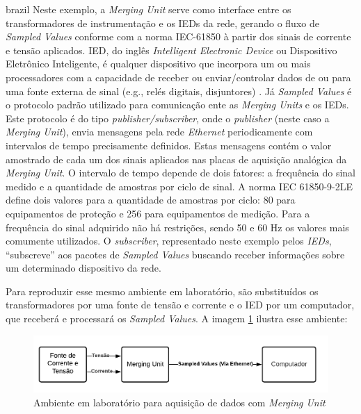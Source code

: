\begin{otherlanguage*}{brazil}
Neste exemplo, a \textit{Merging Unit} serve como interface entre os transformadores de instrumentação e os IEDs da rede, gerando o fluxo de \textit{Sampled Values} conforme com a norma IEC-61850 \cite{IEC61850_7-2} à partir dos sinais de corrente e tensão aplicados. IED, do inglês \textit{Intelligent Electronic Device} ou Dispositivo Eletrônico Inteligente, é qualquer dispositivo que incorpora um ou mais processadores com a capacidade de receber ou enviar/controlar dados de ou para uma fonte externa de sinal (e.g., relés digitais, disjuntores) \cite{substation_basics}. Já \textit{Sampled Values} \cite{sv_typhoonhil} é o protocolo padrão utilizado para comunicação ente as \textit{Merging Units} e os IEDs. Este protocolo é do tipo \textit{publisher/subscriber}, onde o \textit{publisher} (neste caso a \textit{Merging Unit}), envia mensagens pela rede \textit{Ethernet} periodicamente com intervalos de tempo precisamente definidos. Estas mensagens contém o valor amostrado de cada um dos sinais aplicados nas placas de aquisição analógica da \textit{Merging Unit}. O intervalo de tempo depende de dois fatores: a frequência do sinal medido e a quantidade de amostras por ciclo de sinal. A norma IEC 61850-9-2LE \cite{IEC61850_7-2} define dois valores para a quantidade de amostras por ciclo: 80 para equipamentos de proteção e 256 para equipamentos de medição. Para a frequência do sinal adquirido não há restrições, sendo 50 e 60 Hz os valores mais comumente utilizados. O \textit{subscriber}, representado neste exemplo pelos \textit{IEDs}, ``subscreve'' aos pacotes de \textit{Sampled Values} buscando receber informações sobre um determinado dispositivo da rede.

Para reproduzir esse mesmo ambiente em laboratório, são substituídos os transformadores por uma fonte de tensão e corrente e o IED por um computador, que receberá e processará os \textit{Sampled Values}. A imagem \ref{fig:met_acq} ilustra esse ambiente:

\begin{figure}
    \centering
    \includegraphics[width=12cm]{pictures/met_acq.png}
    \caption{Ambiente em laboratório para aquisição de dados com \textit{Merging Unit}}
    \label{fig:met_acq}
\end{figure}


\end{otherlanguage*}
